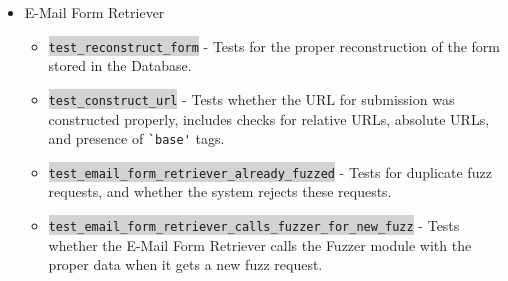 \begin{itemize}
	\item E-Mail Form Retriever
	\begin{itemize}
		\item \colorbox{lightgray}{\lstinline{test_reconstruct_form}} - Tests for the proper reconstruction of the form stored in the Database.
		\item \colorbox{lightgray}{\lstinline{test_construct_url}} - Tests whether the URL for submission was constructed properly, includes checks for relative URLs, absolute URLs, and presence of \lstinline{`base'} tags.
		\item \colorbox{lightgray}{\lstinline{test_email_form_retriever_already_fuzzed}} - Tests for duplicate fuzz requests, and whether the system rejects these requests.
		\item \colorbox{lightgray}{\lstinline{test_email_form_retriever_calls_fuzzer_for_new_fuzz}} - Tests whether the E-Mail Form Retriever calls the Fuzzer module with the proper data when it gets a new fuzz request.
	\end{itemize}
	

\end{itemize}
